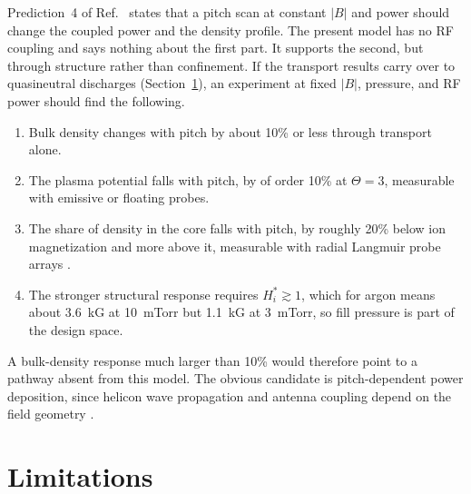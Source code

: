 \documentclass[11pt]{article}
\begin{document}
Prediction~4 of Ref.~\cite{auerbach2026} states that a pitch scan at constant $|B|$ and power should change the coupled power and the density profile. The present model has no RF coupling and says nothing about the first part. It supports the second, but through structure rather than confinement. If the transport results carry over to quasineutral discharges (Section~\ref{sec:limitations}), an experiment at fixed $|B|$, pressure, and RF power should find the following.
\begin{enumerate}
  \item Bulk density changes with pitch by about 10\% or less through transport alone.
  \item The plasma potential falls with pitch, by of order 10\% at $\Theta = 3$, measurable with emissive or floating probes.
  \item The share of density in the core falls with pitch, by roughly 20\% below ion magnetization and more above it, measurable with radial Langmuir probe arrays \cite{hutchinson}.
  \item The stronger structural response requires $H_i^* \gtrsim 1$, which for argon means about 3.6~kG at 10~mTorr but 1.1~kG at 3~mTorr, so fill pressure is part of the design space.
\end{enumerate}
A bulk-density response much larger than 10\% would therefore point to a pathway absent from this model. The obvious candidate is pitch-dependent power deposition, since helicon wave propagation and antenna coupling depend on the field geometry \cite{chenarnush1997,chen2015}.

\section{Limitations}
\label{sec:limitations}
\end{document}
